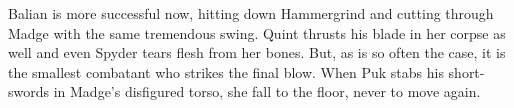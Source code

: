 Balian is more successful now, hitting down Hammergrind and cutting through Madge with the same tremendous swing. Quint thrusts his blade in her corpse as well and even Spyder tears flesh from her bones. But, as is so often the case, it is the smallest combatant who strikes the final blow. When Puk stabs his short-swords in Madge's disfigured torso, she fall to the floor, never to move again.\\

